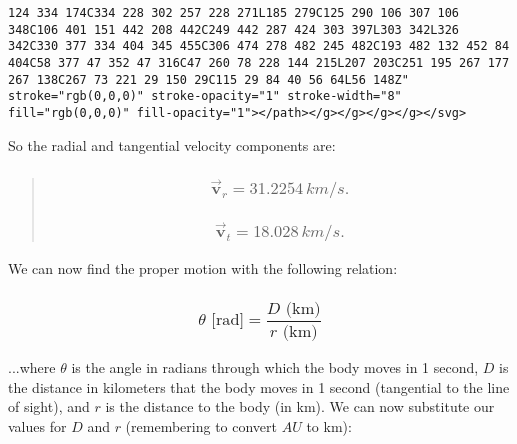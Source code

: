 \documentclass[
]{article}
\begin{document}
\begin{verbatim}
124 334 174C334 228 302 257 228 271L185 279C125 290 106 307 106 348C106 401 151 442 208 442C249 442 287 424 303 397L303 342L326 342C330 377 334 404 345 455C306 474 278 482 245 482C193 482 132 452 84 404C58 377 47 352 47 316C47 260 78 228 144 215L207 203C251 195 267 177 267 138C267 73 221 29 150 29C115 29 84 40 56 64L56 148Z" stroke="rgb(0,0,0)" stroke-opacity="1" stroke-width="8" fill="rgb(0,0,0)" fill-opacity="1"></path></g></g></g></g></svg>
\end{verbatim}

So the radial and tangential velocity components are:

\begin{quote}
\hypertarget{oversetrightarrowmathbfv_r-31.2254-kms.}{%
\subsubsection{\texorpdfstring{{\[{\overset{\rightarrow}{\mathbf{v}}}_{r} = 31.2254\, km/s.\]}}{\{\textbackslash overset\{\textbackslash rightarrow\}\{\textbackslash mathbf\{v\}\}\}\_\{r\} = 31.2254\textbackslash, km/s.}}\label{oversetrightarrowmathbfv_r-31.2254-kms.}}

\hypertarget{oversetrightarrowmathbfv_t-18.028-kms.}{%
\subsubsection{\texorpdfstring{{\[{\overset{\rightarrow}{\mathbf{v}}}_{t} = 18.028\, km/s.\]}}{\{\textbackslash overset\{\textbackslash rightarrow\}\{\textbackslash mathbf\{v\}\}\}\_\{t\} = 18.028\textbackslash, km/s.}}\label{oversetrightarrowmathbfv_t-18.028-kms.}}
\end{quote}

We can now find the proper motion with the following relation:

\hypertarget{thetatextrad-fracdtextkmrtextkm}{%
\subsubsection{\texorpdfstring{{\[\theta\text{~[rad]} = \frac{D\text{~(km)}}{r\text{~(km)}}\]}}{\textbackslash theta\textbackslash text\{\textasciitilde{[}rad{]}\} = \textbackslash frac\{D\textbackslash text\{\textasciitilde(km)\}\}\{r\textbackslash text\{\textasciitilde(km)\}\}}}\label{thetatextrad-fracdtextkmrtextkm}}

...where {\(\theta\)} is the angle in radians through which the body
moves in 1 second, {\(D\)} is the distance in kilometers that the body
moves in 1 second (tangential to the line of sight), and {\(r\)} is the
distance to the body (in km). We can now substitute our values for
{\(D\)} and {\(r\)} (remembering to convert {\(AU\)} to km):
\end{document}
